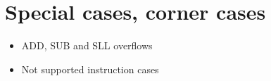 \section{Special cases, corner cases}

\begin{itemize}
  \item ADD, SUB and SLL overflows
  \item Not supported instruction cases
\end{itemize}